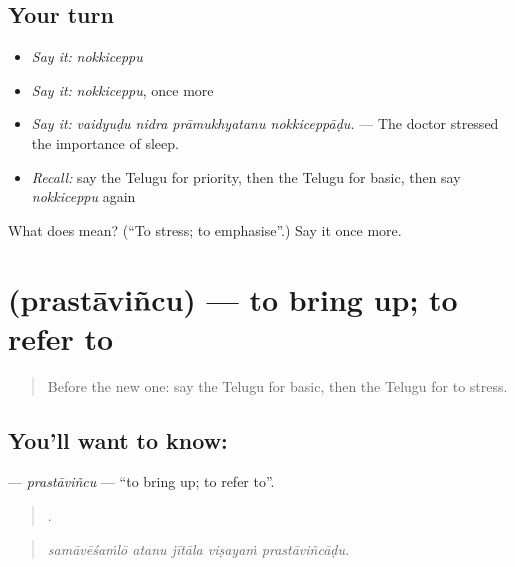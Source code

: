 \subsection*{Your turn}
\begin{itemize}
\raggedright
  \item \emph{Say it:} \emph{nokkiceppu}
  \item \emph{Say it:} \emph{nokkiceppu}, once more
  \item \emph{Say it:} \emph{vaidyuḍu nidra prāmukhyatanu nokkiceppāḍu.} — The doctor stressed the importance of sleep.
  \item \emph{Recall:} say the Telugu for priority, then the Telugu for basic, then say \emph{nokkiceppu} again
\end{itemize}

\begin{tcolorbox}[breakable,colback=teal!4,colframe=teal!35!black,title={Before you move on}]
What does  mean? (\textquotedblleft{}To stress; to emphasise\textquotedblright{}.) Say it once more.
\end{tcolorbox}
\section[\texorpdfstring{\te{ప్రస్తావించు} (prastāviñcu)}{ప్రస్తావించు (prastāviñcu)}]{ (prastāviñcu) — to bring up; to refer to}

\label{lesson:TE-C391-prastavincu}



\begin{quote}
Before the new one: say the Telugu for basic, then the Telugu for to stress.
\end{quote}

\subsection*{You'll want to know: }
\textbf{} — \emph{prastāviñcu} — \textquotedblleft{}to bring up; to refer to\textquotedblright{}.

\begin{quote}
    .
\end{quote}

\begin{quote}
\emph{samāvēśaṁlō atanu jītāla viṣayaṁ prastāviñcāḍu.}
\end{quote}

